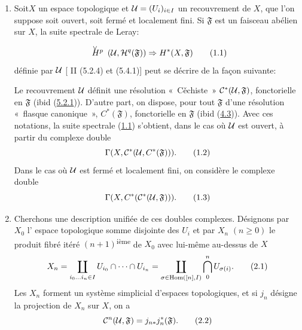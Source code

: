 \documentclass[10pt]{../fichiers-configuration-latex/smfart}
\begin{document}
\begin{enumerate}
\renewcommand{\labelenumi}{\theenumi.}
\item Soit\pageoriginale $X$ un espace topologique et ${\mathcal U} = (U_i)_{i
  \in I}$ un recouvrement de $X$, que l'on suppose soit ouvert, soit
  fermé et localement fini. Si $\mathfrak{F}$ est un faisceau abélien
  sur $X$, la suite spectrale de Leray:
\begin{equation*}
\Hv{p} (\Uu, \mathcal{H}^q (\mathfrak{F})) \Rightarrow H^{\ast}
(X, \mathfrak{F})\tag{1.1}
\end{equation*}
définie par ${\mathcal U}$ [\cite{SGA4-05bis:5} II (5.2.4) et (5.4.1)] peut se décrire
de la façon suivante:

Le recouvrement ${\mathcal U}$ définit une résolution « C\v{e}chiste »
$\mathcal{C}^{\ast} ({\mathcal U}, \mathfrak{F})$, fonctorielle en $\mathfrak{F}$
(ibid (\hyperref[Vbis.subsubsec5.2.1]{5.2.1})). D'autre part, on dispose, pour tout
$\mathfrak{F}$ d'une résolution « flasque canonique »,
$C^{\ast}(\mathfrak{F})$, fonctorielle en $\mathfrak{F}$ (ibid
(\hyperref[Vbis.subsec4.3]{4.3})). Avec ces notations, la suite spectrale
(\hyperref[Vbis.subsec1.1]{1.1}) s'obtient, dans le cas où ${\mathcal U}$ est ouvert, à
partir du complexe double
\begin{equation*}
\Gamma(X, \mathcal{C}^{\ast} ({\mathcal U}, C^{\ast}(\mathfrak{F}))){}.\tag{1.2}
\end{equation*}
Dans le cas où ${\mathcal U}$ est fermé et localement fini, on considère
le complexe double
\begin{equation*}
\Gamma(X, C^{\ast} (\mathcal{C}^{\ast}({\mathcal U}, \mathfrak{F}))){}.\tag{1.3}
\end{equation*}

\item Cherchons une description unifiée de ces doubles complexes. Désignons
par $X_{0}$ l' espace topologique somme disjointe des $U_i$ et par
$X_n$ $(n \geq 0)$ le produit fibré itéré $(n + 1)$\textsuperscript{ième} de
$X_{0}$ avec lui-même au-dessus de $X$
\begin{equation*}
X_n = \mathop{\coprod}_{i_0 \dots i_n \in I} U_{i_{0}} \cap \dots
  \cap U_{i_n} = \mathop{\coprod}_{\sigma \in \operatorname{Hom} ([n], I)}
  \mathop{\bigcap}^{n}_{0} U_{\sigma(i)}{}.\tag{2.1}
\end{equation*}
Les $X_n$ forment un système simplicial d'espaces topologiques, et si
$j_n$ désigne la projection de $X_n$ sur $X$, on a
\begin{equation*}
\mathcal{C}^n({\mathcal U}, \mathfrak{F}) = j_{n\ast}
j^{\ast}_n(\mathfrak{F}){}.\tag{2.2}
\end{equation*}


\end{enumerate}
\end{document}
